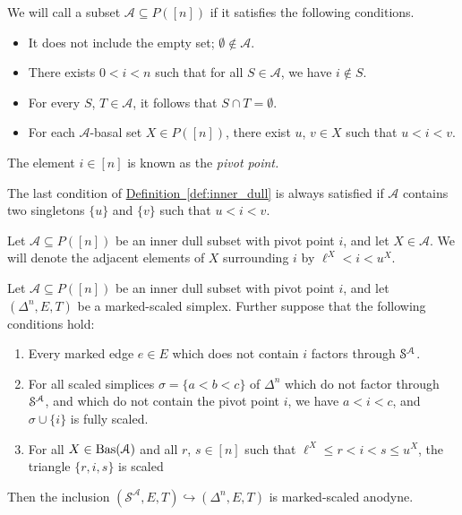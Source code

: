 \documentclass[main.tex]{subfiles}
\begin{document}
\begin{definition}
  \label{def:inner_dull}
  We will call a subset $\mathcal{A} \subseteq P([n])$  if it satisfies the following conditions.
  \begin{itemize}
    \item It does not include the empty set; $\emptyset \notin \mathcal{A}$.

    \item There exists $0 < i < n$ such that for all $S \in \mathcal{A}$, we have $i \notin S$.

    \item For every $S$, $T \in \mathcal{A}$, it follows that $S \cap T = \emptyset$.

    \item For each $\mathcal{A}$-basal set $X \in P([n])$, there exist $u$, $v \in X$ such that $u < i < v$.
  \end{itemize}

  The element $i \in [n]$ is known as the \emph{pivot point.}
\end{definition}

\begin{note}
  The last condition of \hyperref[def:inner_dull]{Definition~\ref*{def:inner_dull}} is always satisfied if $\mathcal{A}$ contains two singletons $\{u\}$ and $\{v\}$ such that $u < i < v$.
\end{note}

\begin{definition}
  Let $\mathcal{A} \subseteq P([n])$ be an inner dull subset with pivot point $i$, and let $X \in \mathcal{A}$. We will denote the adjacent elements of $X$ surrounding $i$ by $\ell^{X} < i < u^{X}$.
\end{definition}


\begin{lemma}
  \label{lemma:pivot_trick}
  Let $\mathcal{A} \subseteq P([n])$ be an inner dull subset with pivot point $i$, and let $(\Delta^{n}, E, T)$ be a marked-scaled simplex. Further suppose that the following conditions hold:
  \begin{enumerate}
    \item Every marked edge $e \in E$ which does not contain $i$ factors through $\S^{\mathcal{A}}$.

    \item For all scaled simplices $\sigma = \{a < b < c\}$ of $\Delta^{n}$ which do not factor through $\S^{\mathcal{A}}$, and which do not contain the pivot point $i$, we have $a < i < c$, and $\sigma \cup \{i\}$ is fully scaled.

    \item For all $X \in \Bas(\mathcal{A})$ and all $r$, $s \in [n]$ such that $\ell^{X} \leq r < i < s \leq u^{X}$, the triangle $\{r, i, s\}$ is scaled
  \end{enumerate}

  Then the inclusion $(\mathcal{S}^{\mathcal{A}}, E, T) \hookrightarrow (\Delta^{n}, E, T)$ is marked-scaled anodyne.
\end{lemma}
\end{document}
